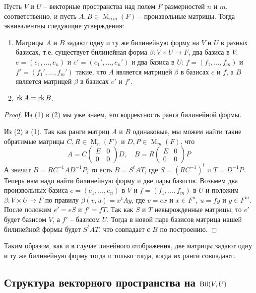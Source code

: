 \begin{claim}
Пусть $V$ и $U$ -- векторные пространства над полем $F$ размерностей $n$ и $m$, соответственно, и пусть $A,B\in \operatorname{M}_{n\,m}(F)$ -- произвольные матрицы.
Тогда эквивалентны следующие утверждения:
\begin{enumerate}
\item Матрицы $A$ и $B$ задают одну и ту же билинейную форму на $V$ и $U$ в разных базисах, т.е. существует билинейная форма $\beta\colon V\times U\to F$, два базиса в $V$: $e=(e_1,\ldots,e_n)$ и $e'=(e_1',\ldots,e_n')$ и два базиса в $U$: $f=(f_1,\ldots,f_m)$ и $f'=(f_1',\ldots,f_m')$ такие, что $A$ является матрицей $\beta$ в базисах $e$ и $f$, а $B$ является матрицей $\beta$ в базисах $e'$ и $f'$.

\item $\operatorname{rk} A = \operatorname{rk} B$.
\end{enumerate}
\end{claim}
\begin{proof}
Из (1) в (2) мы уже знаем, это корректность ранга билинейной формы.

Из (2) в (1).
Так как ранги матриц $A$ и $B$ одинаковые, мы можем найти такие обратимые матрицы $C,R \in \operatorname{M}_{n}(F)$ и $D, P\in \operatorname{M}_{m}(F)$, что
\[
A = C
\begin{pmatrix}
{E}&{0}\\
{0}&{0}
\end{pmatrix}
D,
\quad
B = R
\begin{pmatrix}
{E}&{0}\\
{0}&{0}
\end{pmatrix}
P
\]
А значит $B = RC^{-1}AD^{-1}P$, то есть $B = S^t A T$, где $S = (RC^{-1})^t$ и $T = D^{-1}P$.
Теперь нам надо найти билинейную форму  и две пары базисов.
Возьмем два произвольных базиса $e=(e_1,\ldots,e_n)$ в $V$ и $f=(f_1,\ldots,f_m)$ в $U$ и положим $\beta\colon V\times U \to F$ по правилу $\beta(v, u) = x^t A y$, где $v = ex$ и $x\in F^n$, $u = f y$ и $y\in F^m$.
После положим $e' = e S$ и $f' = fT$.
Так как $S$ и $T$ невырожденные матрицы, то $e'$ будет базисом $V$, а $f'$ -- базисом $U$.
Тогда в новой паре базисов матрица нашей билинейной формы будет $S^t A T$, что совпадает с $B$ по построению.
\end{proof}

Таким образом, как и в случае линейного отображения, две матрицы задают одну и ту же билинейную форму тогда и только тогда, когда их ранги совпадают.


\subsection{Структура векторного пространства на $\operatorname{Bil}(V,U)$}

